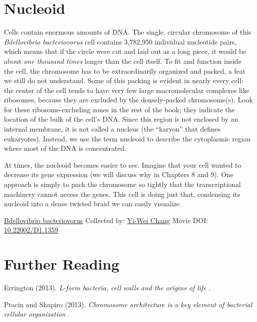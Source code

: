 \documentclass[]{tufte-book}
\begin{document}
\hypertarget{nucleoid}{%
\section{Nucleoid}\label{nucleoid}}

Cells contain enormous amounts of DNA. The single, circular chromosome of this \emph{Bdellovibrio bacteriovorus} cell contains 3,782,950 individual nucleotide pairs, which means that if the circle were cut and laid out as a long piece, it would be about \emph{one thousand times} longer than the cell itself. To fit and function inside the cell, the chromosome has to be extraordinarily organized and packed, a feat we still do not understand. Some of this packing is evident in nearly every cell: the center of the cell tends to have very few large macromolecular complexes like ribosomes, because they are excluded by the densely-packed chromosome(s). Look for these ribosome-excluding zones in the rest of the book; they indicate the location of the bulk of the cell's DNA. Since this region is not enclosed by an internal membrane, it is not called a nucleus (the ``karyon'' that defines eukaryotes). Instead, we use the term nucleoid to describe the cytoplasmic region where most of the DNA is concentrated.

At times, the nucleoid becomes easier to see. Imagine that your cell wanted to decrease its gene expression (we will discuss why in Chapters 8 and 9). One approach is simply to pack the chromosome so tightly that the transcriptional machinery cannot access the genes. This cell is doing just that, condensing its nucleoid into a dense twisted braid we can easily visualize.



\hypertarget{htmlwidget-337d416bc328c4407070}{}

\label{fig:2-10}\protect\hyperlink{tree}{Bdellovibrio bacteriovorus} Collected by: \protect\hyperlink{yi-wei_chang}{Yi-Wei Chang} Movie DOI: \href{https://doi.org/10.22002/D1.1359}{10.22002/D1.1359}

\hypertarget{further-reading-1}{%
\section{Further Reading}\label{further-reading-1}}

Errington (2013). \emph{L-form bacteria, cell walls and the origins of life} \citep{errington2013}.

Ptacin and Shapiro (2013). \emph{Chromosome architecture is a key element of bacterial cellular organization} \citep{ptacin2013}.
\end{document}

